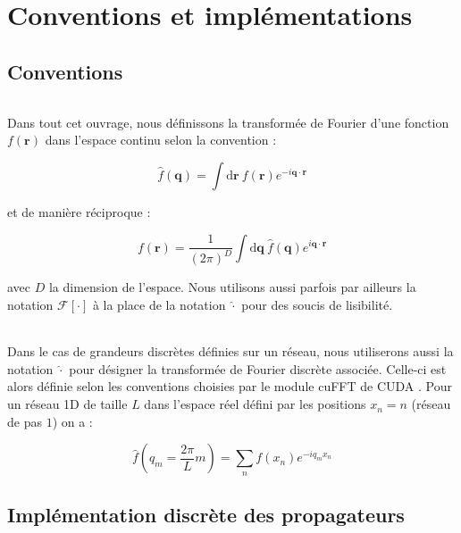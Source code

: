 \appendix
\appendixpage

\setcounter{chapter}{0}

\chapter{Conventions et implémentations}

\section{Conventions}

\label{sec:conv_fourier}

\subparagraph{}Dans tout cet ouvrage, nous définissons la transformée de Fourier d'une fonction $f(\mathbf{r})$ dans l'espace continu selon la convention :

\begin{equation}
	\hat{f}(\mathbf{q}) = \int \mathrm{d}\mathbf{r}~f(\mathbf{r})e^{-i\mathbf{q}\cdot\mathbf{r}}
\end{equation}

\noindent et de manière réciproque :

\begin{equation}
	f(\mathbf{r}) = \frac{1}{(2\pi)^D}\int \mathrm{d}\mathbf{q}~\hat{f}(\mathbf{q})e^{i\mathbf{q}\cdot\mathbf{r}}
\end{equation}

\noindent avec $D$ la dimension de l'espace. Nous utilisons aussi parfois par ailleurs la notation $\mathcal{F}[\cdot]$ à la place de la notation $\hat{\cdot}$ pour des soucis de lisibilité.

\subparagraph{}Dans le cas de grandeurs discrètes définies sur un réseau, nous utiliserons aussi la notation $\hat{\cdot}$ pour désigner la transformée de Fourier discrète associée. Celle-ci est alors définie selon les conventions choisies par le module cuFFT de CUDA \cite{cuda}. Pour un réseau 1D de taille $L$ dans l'espace réel défini par les positions $x_n = n$ (réseau de pas $1$) on a :

\begin{equation}
	\hat{f}(q_m = \frac{2\pi}{L}m) = \sum_{n} f(x_n)e^{-i q_m x_n}
	\label{eq:TFdisc}
\end{equation}

\section{Implémentation discrète des propagateurs}

